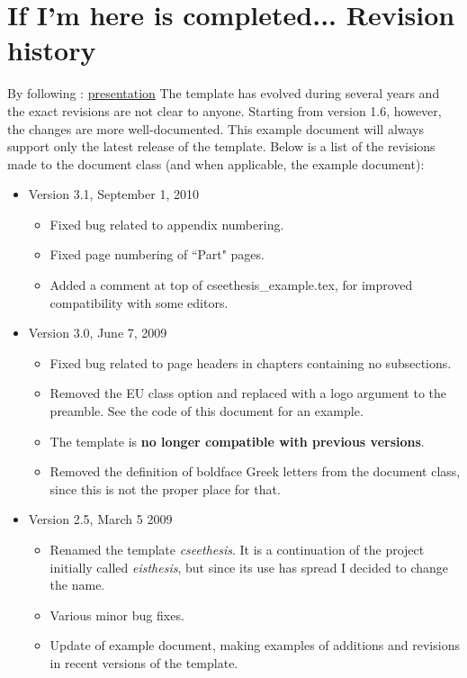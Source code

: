 \section{If I'm here is completed... Revision history}
By following :  \href{https://www.slideshare.net/NasreddineELGUEZAR/how-to-write-a-research-monograph-basics}{presentation} The template has evolved during several years and the exact
revisions are not clear to anyone. Starting from version 1.6,
however, the changes are more well-documented. This example
document will always support only the latest release of the
template. Below is a list of the revisions made to the document
class (and when applicable, the example document):%
\begin{itemize}
	 \item Version 3.1, September 1, 2010
		\begin{itemize}
			\item Fixed bug related to appendix numbering.
			\item Fixed page numbering of ``Part" pages.
			\item Added a comment at top of cseethesis\_example.tex, for improved compatibility with some editors.
		\end{itemize}
	 \item Version 3.0, June 7, 2009
		\begin{itemize}
			\item Fixed bug related to page headers in chapters containing no subsections.
		   \item Removed the EU class option and replaced with a logo argument to the preamble. See the code of this document for an example.
			\item The template is \textbf{no longer compatible with previous versions}.
         \item Removed the definition of boldface Greek letters from the document class, since this is not the proper place for that.
		\end{itemize}
  	 \item Version 2.5, March 5 2009
		\begin{itemize}
         \item Renamed the template \textit{cseethesis}. It is a continuation of the project initially called \textit{eisthesis}, but since its use has spread I decided to change the name.
			\item Various minor bug fixes.
			\item Update of example document, making examples of additions and revisions in recent versions of the template.

\end{itemize}
\end{itemize}
